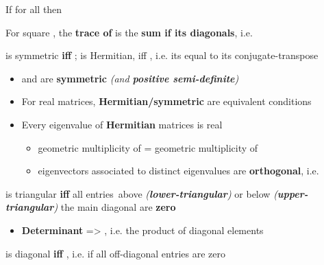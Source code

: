 If  for all  then 

For square , the \textbf{trace of } is the
\textbf{sum if its diagonals}, i.e. 

\hSep %

 is symmetric \textbf{iff} ;  is Hermitian, iff , i.e. its equal
to its conjugate-transpose

\begin{itemize}

      \item
             and  are \textbf{symmetric} \emph{(and
                  \textbf{positive semi-definite})}
      \item
            For real matrices, \textbf{Hermitian/symmetric} are equivalent
            conditions
      \item
            Every eigenvalue  of \textbf{Hermitian} matrices
            is real

            \begin{itemize}

                  \item
                        geometric multiplicity of  = geometric multiplicity of 
                  \item
                        eigenvectors  associated
                        to distinct eigenvalues  are
                        \textbf{orthogonal},
                        i.e. 
            \end{itemize}
\end{itemize}

\hSep %

 is triangular \textbf{iff} all entries~above
\emph{(\textbf{lower-triangular})} or below
\emph{(\textbf{upper-triangular})} the main diagonal are \textbf{zero}

\begin{itemize}
      \item
            \textbf{Determinant} =>
            , i.e. the product of
            diagonal elements
\end{itemize}

\hSep %

 is diagonal \textbf{iff} ,
i.e. if all off-diagonal entries are zero

